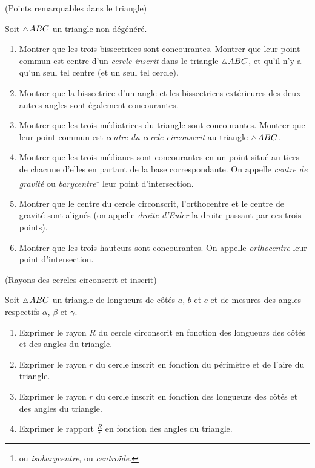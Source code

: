 \documentclass[a4paper,11pt,reqno]{amsart}
\begin{document}
\begin{exo} (Points remarquables dans le triangle)

  Soit $\tri ABC$ un triangle non dégénéré.
  \begin{enumerate}
    \item Montrer que les trois bissectrices sont concourantes. Montrer que leur point commun est centre d'un \emph{cercle inscrit} dans le triangle $\tri ABC$, et qu'il n'y a qu'un seul tel centre (et un seul tel cercle).
    \item Montrer que la bissectrice d'un angle et les bissectrices extérieures des deux autres angles sont également concourantes.
    \item Montrer que les trois médiatrices du triangle sont concourantes. Montrer que leur point commun est \emph{centre du cercle circonscrit} au triangle $\tri ABC$.
    \item Montrer que les trois médianes sont concourantes en un point situé au tiers de chacune d'elles en partant de la base correspondante. On appelle \emph{centre de gravité} ou \emph{barycentre}\footnote{ou \emph{isobarycentre}, ou \emph{centroïde}.} leur point d'intersection.
    \item Montrer que le centre du cercle circonscrit, l'orthocentre et le centre de gravité sont alignés (on appelle \emph{droite d'Euler} la droite passant par ces trois points).
    \item Montrer que les trois hauteurs sont concourantes. On appelle \emph{orthocentre} leur point d'intersection.
  \end{enumerate}
\end{exo}

\begin{exo} (Rayons des cercles circonscrit et inscrit)

  Soit $\tri ABC$ un triangle de longueurs de côtés $a$, $b$ et $c$ et de mesures des angles respectifs $\alpha$, $\beta$ et $\gamma$.
  \begin{enumerate}
    \item Exprimer le rayon $R$ du cercle circonscrit en fonction des longueurs des côtés et des angles du triangle.
    \item Exprimer le rayon $r$ du cercle inscrit en fonction du périmètre et de l'aire du triangle.
    \item Exprimer le rayon $r$ du cercle inscrit en fonction des longueurs des côtés et des angles du triangle.
    \item Exprimer le rapport $\frac{R}{r}$ en fonction des angles du triangle.
  \end{enumerate}
\end{exo}
\end{document}

